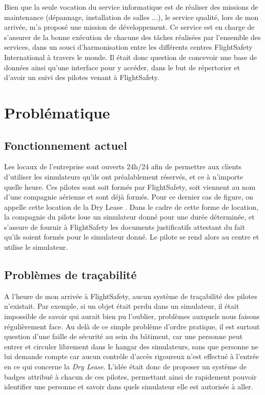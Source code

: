 \documentclass[a4paper,french,11pt,openany,oneside]{memoir}
\begin{document}
Bien que la seule vocation du service informatique est  de réaliser des missions de maintenance (dépannage, installation de salles ...), le service qualité, lors de mon arrivée, m'a proposé une mission de développement. Ce service est en charge de s'assurer de la bonne exécution de chacune des tâches réalisées par l'ensemble des services, dans un souci d'harmonisation entre les différents centres FlightSafety International à travers le monde. Il était donc question de concevoir une base de données ainsi qu'une interface pour y accéder, dans le but de répertorier et d'avoir un suivi des pilotes venant à FlightSafety.

\section{Problématique}

\subsection{Fonctionnement actuel}

Les locaux de l'entreprise sont ouverts 24h/24 afin de permettre aux clients d'utiliser les simulateurs qu'ils ont préalablement réservés, et ce à n'importe quelle heure. Ces pilotes sont soit formés par FlightSafety, soit viennent au nom d'une compagnie aérienne et sont déjà formés. Pour ce dernier cas de figure, on appelle cette location de la \og Dry Lease \fg. Dans le cadre de cette forme de location, la compagnie du pilote loue un simulateur donné pour une durée déterminée, et s'assure de fournir à FlightSafety les documents justificatifs attestant du fait qu'ils soient formés pour le simulateur donné. Le pilote se rend alors au centre et utilise le simulateur. 

\subsection{Problèmes de traçabilité}

A l'heure de mon arrivée à FlightSafety, aucun système de traçabilité des pilotes n'existait. Par exemple, si un objet était perdu dans un simulateur, il était impossible de savoir qui aurait bien pu l'oublier, problèmes auxquels nous faisons régulièrement face. Au delà de ce simple problème d'ordre pratique, il est surtout question d'une faille de sécurité au sein du bâtiment, car une personne peut entrer et circuler librement dans le hangar des simulateurs, sans que personne ne lui demande compte car aucun contrôle d'accès rigoureux n'est effectué à l'entrée en ce qui concerne la \emph{Dry Lease}. L'idée était donc de proposer un système de badges attribué à chacun de ces pilotes, permettant ainsi de rapidement pouvoir identifier une personne et savoir dans quels simulateur elle est autorisée à aller.
\end{document}
